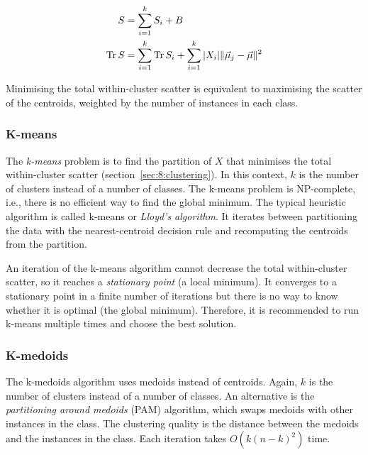 \begin{thm}
  \begin{align}
    S
     & = \sum_{i = 1}^{k} S_i + B \\
    \operatorname{Tr} S
     & = \sum_{i = 1}^{k} \operatorname{Tr} S_i +
    \sum_{i = 1}^{k} |X_i| \lVert \vec{\mu}_j - \vec{\mu} \rVert^2
  \end{align}
\end{thm}

Minimising the total within-cluster scatter is equivalent to maximising the
scatter of the centroids, weighted by the number of instances in each class.

\subsubsection{K-means}

The \textit{k-means} problem is to find the partition of $X$ that minimises
the total within-cluster scatter (section~\ref{sec:8:clustering}).
In this context, $k$ is the number of clusters instead of a number of classes.
The k-means problem is NP-complete, i.e., there is no efficient way to find
the global minimum.
The typical heuristic algorithm is called k-means or
\textit{Lloyd's algorithm}.
It iterates between partitioning the data with the nearest-centroid decision
rule and recomputing the centroids from the partition.

An iteration of the k-means algorithm cannot decrease the total within-cluster
scatter, so it reaches a \textit{stationary point} (a local minimum).
It converges to a stationary point in a finite number of iterations but there is
no way to know whether it is optimal (the global minimum).
Therefore, it is recommended to run k-means multiple times and choose the
best solution.

\subsubsection{K-medoids}

The k-medoids algorithm uses medoids instead of centroids.
Again, $k$ is the number of clusters instead of a number of classes.
An alternative is the \textit{partitioning around medoids} (PAM) algorithm,
which swaps medoids with other instances in the class.
The clustering quality is the distance between the medoids and the instances in
the class.
Each iteration takes $O(k(n - k)^2)$ time.

